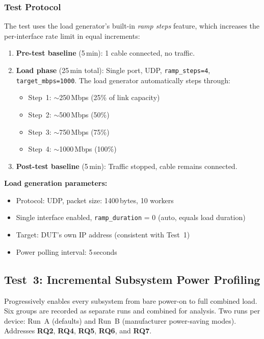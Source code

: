 \subsubsection{Test Protocol}
The test uses the load generator's built-in \emph{ramp steps} feature, which increases the per-interface rate limit in equal increments:
\begin{enumerate}
    \item \textbf{Pre-test baseline} (5\,min): 1 cable connected, no traffic.
    \item \textbf{Load phase} (25\,min total): Single port, \ac{UDP}, \texttt{ramp\_steps=4}, \texttt{target\_mbps=1000}.
    The load generator automatically steps through:
    \begin{itemize}
        \item Step~1: $\sim$250\,Mbps (25\% of link capacity)
        \item Step~2: $\sim$500\,Mbps (50\%)
        \item Step~3: $\sim$750\,Mbps (75\%)
        \item Step~4: $\sim$1000\,Mbps (100\%)
    \end{itemize}
    \item \textbf{Post-test baseline} (5\,min): Traffic stopped, cable remains connected.
\end{enumerate}

\noindent\textbf{Load generation parameters:}
\begin{itemize}
    \item Protocol: \ac{UDP}, packet size: 1400\,bytes, 10 workers
    \item Single interface enabled, \texttt{ramp\_duration} = 0 (auto, equals load duration)
    \item Target: \ac{DUT}'s own IP address (consistent with Test~1)
    \item Power polling interval: 5\,seconds
\end{itemize}

\subsection{Test~3: Incremental Subsystem Power Profiling}
\label{sec:test-subsystem-profiling}

Progressively enables every subsystem from bare power-on to full combined load. Six groups are recorded as separate runs and combined for analysis. Two runs per device: Run~A (defaults) and Run~B (manufacturer power-saving modes). Addresses \textbf{RQ2}, \textbf{RQ4}, \textbf{RQ5}, \textbf{RQ6}, and \textbf{RQ7}.

